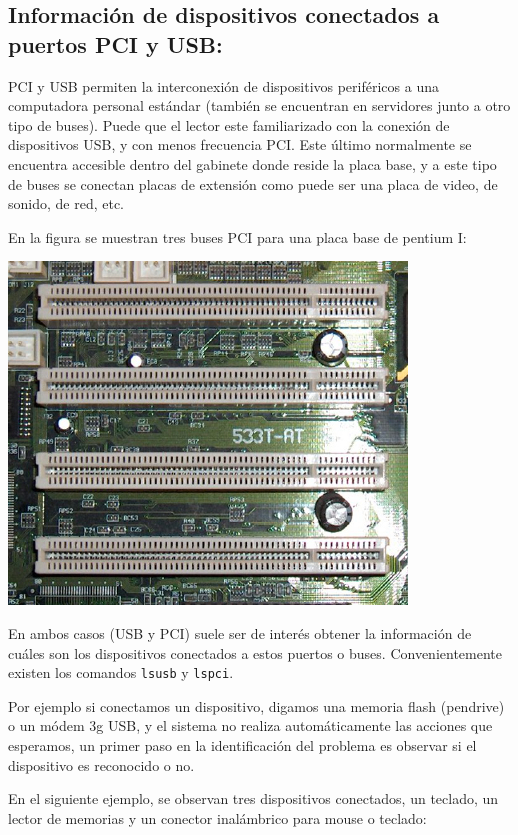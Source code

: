 \documentclass[12pt]{article}
\begin{document}
\subsection*{Información de dispositivos conectados a puertos PCI y USB:}

PCI y USB permiten la interconexión de dispositivos periféricos a una computadora 
personal estándar (también se encuentran en servidores junto a otro tipo de buses). 
Puede que el lector este familiarizado con la conexión de 
dispositivos USB, y con menos frecuencia PCI. Este último normalmente se encuentra 
accesible dentro del gabinete donde reside la placa base, y a este tipo de buses se
conectan placas de extensión como puede ser una placa de video, de sonido, de red, etc.   

En la figura se muestran tres buses PCI para una placa base de pentium I:

\begin{center}
 \includegraphics{Bus_pci.jpg}
\end{center}

En ambos casos (USB y PCI) suele ser de interés obtener la información de cuáles son 
los dispositivos conectados a estos puertos o buses. Convenientemente existen los 
comandos \texttt{lsusb} y \texttt{lspci}. 

Por ejemplo si conectamos un dispositivo, digamos una memoria flash (pendrive) o un 
módem 3g USB, y el sistema no realiza automáticamente las acciones que esperamos, un primer paso en la 
identificación del problema es observar si el dispositivo es reconocido o no. 

En el siguiente ejemplo, se observan tres dispositivos conectados, un teclado, 
un lector de memorias y un conector inalámbrico para mouse o teclado: 
 
\end{document}
